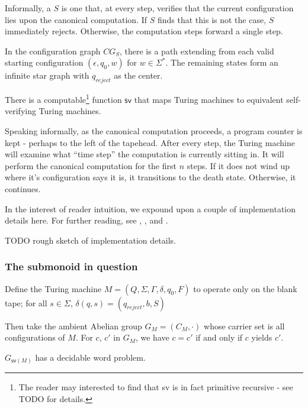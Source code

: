 \documentclass[11pt, titlepage]{article}
\begin{document}
Informally, a  $S$ is one that, at
every step, verifies that the current configuration lies upon the
canonical computation. If $S$ finds that this is not the case, $S$
immediately rejects. Otherwise, the computation steps forward a single
step.

In the configuration graph $CG_S$, there is a path extending from each
valid starting configuration $(\epsilon, q_0, w)$ for $w \in \Sigma^*$. The remaining states form an infinite star graph with $q_{reject}$ as the center.

\begin{proposition}
  There is a computable\footnote{The reader may interested to find
  that \textsf{sv} is in fact primitive recursive - see TODO for
  details.} function $\textsf{sv}$ that maps Turing machines to
  equivalent self-verifying Turing machines.
\end{proposition}

Speaking informally, as the canonical computation proceeds, a program
counter is kept - perhaps to the left of the tapehead. After every
step, the Turing machine will examine what ``time step'' the
computation is currently sitting in. It will perform the canonical
computation for the first $n$ steps. If it does not wind up where it's
configuration says it is, it transitions to the death
state. Otherwise, it continues.

In the interest of reader intuition, we expound upon a couple of
implementation details here. For further reading, see
\cite{davis:note_utm}, \cite{davis:defn_utm}, and
\cite{shepherdson:machine_config}.

TODO rough sketch of implementation details.

\subsubsection*{The submonoid in question}
Define the Turing machine $M = (Q, \Sigma, \Gamma, \delta, q_0, F)$ to
operate only on the blank tape; for all $s \in \Sigma$,
$\delta(q, s) = (q_{reject}, b, S)$


Then take the ambient Abelian group $G_M = (C_M, \cdot)$ whose carrier
set is all configurations of $M$. For $c$, $c'$ in $G_M$, we have
$c = c'$ if and only if $c$ yields $c'$.

\begin{proposition}
  $G_{\textsf{sv}(M)}$ has a decidable word problem.
\end{proposition}
\end{document}
